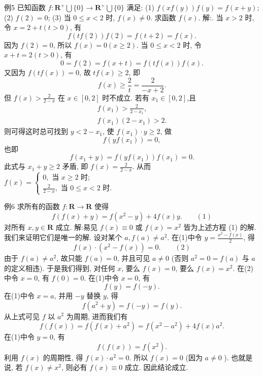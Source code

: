 例5 已知函数 $f: \mathbf{R}^{+} \bigcup\{0\} \rightarrow \mathbf{R}^{+} \bigcup\{0\}$ 满足:
(1) $f(x f(y)) f(y)=f(x+y)$;
(2) $f(2)=0$;
(3) 当 $0 \leqslant x<2$ 时, $f(x) \neq 0$.
求函数 $f(x)$.
解:.
当 $x>2$ 时, 令 $x=2+t(t>0)$, 有
$$
f(t f(2)) f(2)=f(t+2)=f(x) .
$$
因为 $f(2)=0$, 所以 $f(x)=0(x \geqslant 2)$.
当 $0 \leqslant x<2$ 时, 令 $x+t=2(t>0)$, 有
$$
0=f(2)=f(x+t)=f(t f(x)) f(x) .
$$
又因为 $f(t f(x))=0$, 故 $t f(x) \geqslant 2$, 即
$$
f(x) \geqslant \frac{2}{t}=\frac{2}{-x+2} .
$$
但 $f(x)>\frac{2}{2-x}$ 在 $x \in[0,2]$ 时不成立.
若有 $x_1 \in[0,2]$,且
$$
\begin{gathered}
f\left(x_1\right)>\frac{2}{2-x_1}, \\
f\left(x_1\right)\left(2-x_1\right)>2 .
\end{gathered}
$$
则可得这时总可找到 $y<2-x_1$, 使 $f\left(x_1\right) \cdot y \geqslant 2$, 做
$$
f\left(y f\left(x_1\right)\right)=0,
$$
也即
$$
f\left(x_1+y\right)=f\left(y f\left(x_1\right)\right) f\left(x_1\right)=0 .
$$
此式与 $x_1+y \geqslant 2$ 矛盾, 即 $f(x)=\frac{2}{2-x}$.
从而 $f(x)=\left\{\begin{array}{l}0, \text { 当 } x \geqslant 2 \text { 时; } \\ \frac{2}{2-x}, \text { 当 } 0 \leqslant x<2 \text { 时.
}\end{array}\right.$



例6 求所有的函数 $f: \mathbf{R} \rightarrow \mathbf{R}$ 使得
$$
f(f(x)+y)=f\left(x^2-y\right)+4 f(x) y . \quad\quad (1)
$$
对所有 $x, y \in \mathbf{R}$ 成立.
解:易见 $f(x) \equiv 0$ 或 $f(x)=x^2$ 皆为上述方程 (1) 的解.
我们来证明它们是唯一的解.
设对某个 $a, f(a) \neq a^2$.
在(1)中令 $y=\frac{x^2-f(x)}{2}$, 得
$$
f(x) \cdot\left(x^2-f(x)\right)=0 .\quad\quad (2)
$$
由于 $f(a) \neq a^2$, 故只能 $f(a)=0$, 并且可见 $a \neq 0$ (否则 $a^2=0=f(a)$ 与 $a$ 的定义相违).
于是我们得到, 对任何 $x$, 要么 $f(x)=0$, 要么 $f(x)=x^2$.
在(2)中令 $x=0$, 有 $f(0)=0$.
在(1)中令 $x=0$, 有
$$
f(y)=f(-y) .
$$
在(1)中令 $x=a$, 并用 $-y$ 替换 $y$, 得
$$
f\left(a^2+y\right)=f(-y)=f(y) .
$$
从上式可见 $f$ 以 $a^2$ 为周期, 进而我们有
$$
f(f(x))=f\left(f(x)+a^2\right)=f\left(x^2-a^2\right)+4 f(x) a^2 .
$$
在(1)中令 $y=0$, 有
$$
f(f(x))=f\left(x^2\right) .
$$
利用 $f(x)$ 的周期性, 得 $f(x) \cdot a^2=0$.
所以 $f(x)=0$ (因为 $a \neq 0$ ).
也就是说, 若 $f(x) \neq x^2$, 则必有 $f(x) \equiv 0$ 成立.
因此结论成立.



